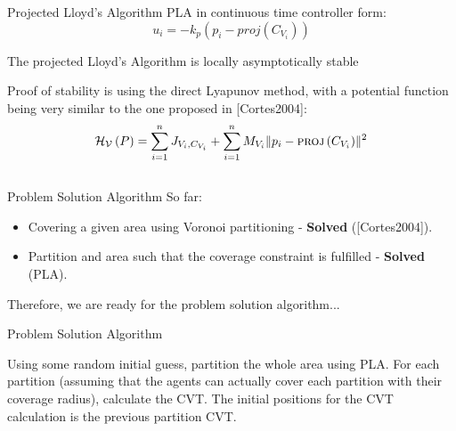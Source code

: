 \documentclass[t]{beamer}
\newcommand{\norm}[1]{\lVert #1 \rVert}
\begin{document}
\begin{frame}[label=projlloydsalgotheorem]{Projected Lloyd's Algorithm}
PLA in continuous time controller form:
\begin{equation*} \label{ProjectedLloydsContol}
u_{i} = -k_{p}\left( p_i - \textit{proj}\left( C_{V_{i}} \right) \right)
\end{equation*} 

\begin{theorem}
The projected Lloyd's Algorithm is locally asymptotically stable
\end{theorem}

Proof of stability is using the direct Lyapunov method, with a potential function being very similar to the one proposed in [Cortes2004]:
\begin{equation*}
\mathcal{H_{V}}\left( P \right) = \sum_{i=1}^{n} J_{V_i,C_{V_i}} + \sum_{i=1}^{n} M_{V_i} \norm{p_i - \textsc{proj}\left( C_{V_i}\right)}^2
\end{equation*}
\end{frame}

\subsection[Problem Solution Algorithm]{}
\begin{frame}[label=probsolalg1]{Problem Solution Algorithm}
So far:
\begin{itemize}
\item Covering a given area using Voronoi partitioning - \textbf{Solved} ([Cortes2004]).
\item Partition and area such that the coverage constraint is fulfilled - \textbf{Solved} (PLA).
\end{itemize}

Therefore, we are ready for the problem solution algorithm...
\end{frame}

\begin{frame}[label=probsolalg2]{Problem Solution Algorithm}
\begin{algorithm}[H]
\caption{Problem Solution Algorithm}\label{GeneralProbSolution}
\begin{algorithmic}[1]
\State Using some random initial guess, partition the whole area using PLA.
\State For each partition (assuming that the agents can actually cover each partition with their coverage radius), calculate the CVT. The initial positions for the CVT calculation is the previous partition CVT.
\end{algorithmic}
\end{algorithm}
\end{frame}
\end{document}
